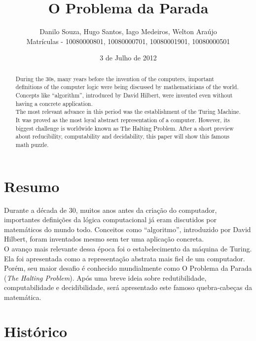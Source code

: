 \documentclass[a4paper,10pt]{article}
\title{O Problema da Parada}
\author{Danilo Souza, Hugo Santos, Iago Medeiros, Welton Araújo\\
Matr\'iculas - 10080000801, 10080000701, 10080001901, 10080000501}
\date {3 de Julho de 2012}
\begin{document}
\maketitle

\begin{abstract}
 
During the 30s, many years before the invention of the computers, important definitions of the computer logic were being discussed by mathematicians of the world. Concepts like “algorithm”, introduced by David Hilbert, were invented even without having a concrete application.\\
The most relevant advance in this period was the establishment of the Turing Machine. It was proved as the most loyal abstract representation of a computer. However, its biggest challenge is worldwide known as The Halting Problem. After a short preview about reducibility, computability and decidability, this paper will show this famous math puzzle.\\


\end{abstract}


\section{Resumo}

Durante a década de 30, muitos anos antes da criação do computador, importantes definições da lógica computacional já eram discutidos por matemáticos do mundo todo. Conceitos como “algoritmo”, introduzido por David Hilbert, foram inventados mesmo sem ter uma aplicação concreta. \\
O avanço mais relevante dessa época foi o estabelecimento da máquina de Turing. Ela foi apresentada como a representação abstrata mais fiel de um computador. Porém, seu maior desafio é conhecido mundialmente como O Problema da Parada (\textit{The Halting Problem}). Após uma breve ideia sobre redutibilidade, computabilidade e decidibilidade, será apresentado este famoso quebra-cabeças da matemática.\\
 
\section{Histórico}
\end{document}
